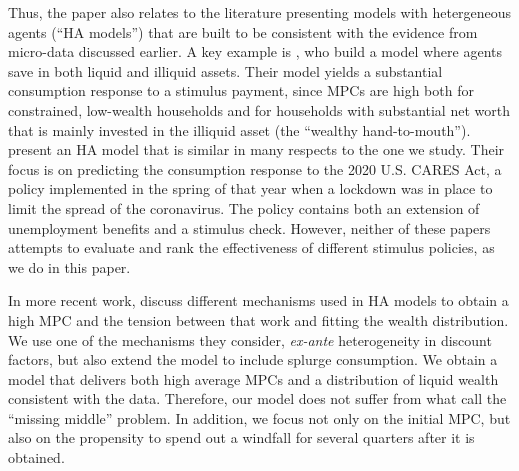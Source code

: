 \documentclass[\econtexRoot/HAFiscal]{subfiles}
\begin{document}
Thus, the paper also relates to the literature presenting models with hetergeneous agents (``HA models'') that are built to be consistent with the evidence from micro-data discussed earlier. A key example is \cite{kaplan2014model}, who build a model where agents save in both liquid and illiquid assets. Their model yields a substantial consumption response to a stimulus payment, since MPCs are high both for constrained, low-wealth households and for households with substantial net worth that is mainly invested in the illiquid asset (the ``wealthy hand-to-mouth''). \cite{carroll2020modeling} present an HA model that is similar in many respects to the one we study. Their focus is on predicting the consumption response to the 2020 U.S. CARES Act, a policy implemented in the spring of that year when a lockdown was in place to limit the spread of the coronavirus. The policy contains both an extension of unemployment benefits and a stimulus check. However, neither of these papers attempts to evaluate and rank the effectiveness of different stimulus policies, as we do in this paper. 

In more recent work, \cite{kaplanMPC2022} discuss different mechanisms used in HA models to obtain a high MPC and the tension between that work and fitting the wealth distribution. We use one of the mechanisms they consider, \textit{ex-ante} heterogeneity in discount factors, but also extend the model to include splurge consumption. We obtain a model that delivers both high average MPCs and a distribution of liquid wealth consistent with the data. Therefore, our model does not suffer from what \cite{kaplanMPC2022} call the ``missing middle'' problem. In addition, we focus not only on the initial MPC, but also on the propensity to spend out a windfall for several quarters after it is obtained. 
\end{document}
